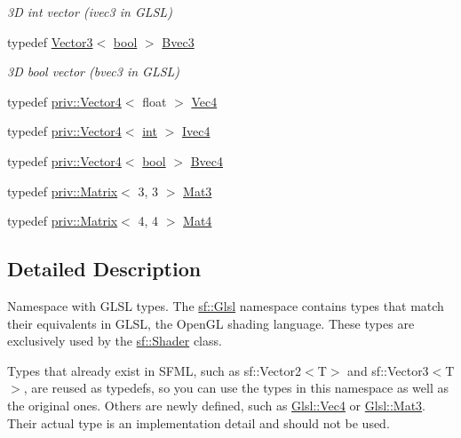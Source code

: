 \begin{DoxyCompactItemize}
\begin{DoxyCompactList}\small\item\em 3\-D int vector ({\ttfamily ivec3} in G\-L\-S\-L) \end{DoxyCompactList}\item 
typedef \hyperlink{classsf_1_1_vector3}{Vector3}$<$ \hyperlink{term__entry_8h_a002004ba5d663f149f6c38064926abac}{bool} $>$ \hyperlink{namespacesf_1_1_glsl_a4166ffc506619b4912d576e6eba2c957}{Bvec3}
\begin{DoxyCompactList}\small\item\em 3\-D bool vector ({\ttfamily bvec3} in G\-L\-S\-L) \end{DoxyCompactList}\item 
typedef \hyperlink{structsf_1_1priv_1_1_vector4}{priv\-::\-Vector4}$<$ float $>$ \hyperlink{namespacesf_1_1_glsl_a862f8df4771d2403de28653328fac5d0}{Vec4}
\item 
typedef \hyperlink{structsf_1_1priv_1_1_vector4}{priv\-::\-Vector4}$<$ \hyperlink{term__entry_8h_ad65b480f8c8270356b45a9890f6499ae}{int} $>$ \hyperlink{namespacesf_1_1_glsl_abcba8791f75382199ea03f6932a91d9b}{Ivec4}
\item 
typedef \hyperlink{structsf_1_1priv_1_1_vector4}{priv\-::\-Vector4}$<$ \hyperlink{term__entry_8h_a002004ba5d663f149f6c38064926abac}{bool} $>$ \hyperlink{namespacesf_1_1_glsl_a5f4f38e06558ae1baa610b119e45ea0b}{Bvec4}
\item 
typedef \hyperlink{structsf_1_1priv_1_1_matrix}{priv\-::\-Matrix}$<$ 3, 3 $>$ \hyperlink{namespacesf_1_1_glsl_a1bf4595b60b08c79473a882e2c1dbff8}{Mat3}
\item 
typedef \hyperlink{structsf_1_1priv_1_1_matrix}{priv\-::\-Matrix}$<$ 4, 4 $>$ \hyperlink{namespacesf_1_1_glsl_aab545f0a373a3ea8ad145811b747f3e4}{Mat4}
\end{DoxyCompactItemize}


\subsection{Detailed Description}
Namespace with G\-L\-S\-L types. The \hyperlink{namespacesf_1_1_glsl}{sf\-::\-Glsl} namespace contains types that match their equivalents in G\-L\-S\-L, the Open\-G\-L shading language. These types are exclusively used by the \hyperlink{classsf_1_1_shader}{sf\-::\-Shader} class.

Types that already exist in S\-F\-M\-L, such as sf\-::\-Vector2$<$\-T$>$ and sf\-::\-Vector3$<$\-T$>$, are reused as typedefs, so you can use the types in this namespace as well as the original ones. Others are newly defined, such as \hyperlink{namespacesf_1_1_glsl_a862f8df4771d2403de28653328fac5d0}{Glsl\-::\-Vec4} or \hyperlink{namespacesf_1_1_glsl_a1bf4595b60b08c79473a882e2c1dbff8}{Glsl\-::\-Mat3}. Their actual type is an implementation detail and should not be used.

